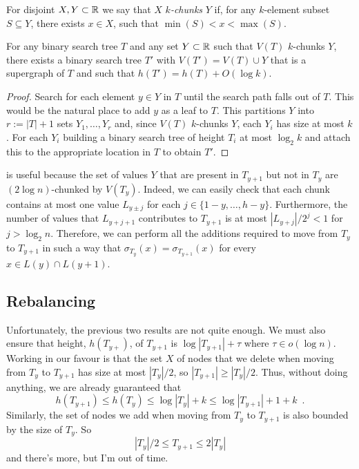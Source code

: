 \documentclass[kpfonts]{patmorin}
\begin{document}
For disjoint $X,Y\subset \mathbb{R}$ we say that $X$ \emph{$k$-chunks} $Y$ if, for any $k$-element subset $S\subseteq Y$, there exists $x\in X$, such that $\min(S)< x<\max(S)$. 

\begin{lem}
  For any binary search tree $T$ and any set $Y\subset\mathbb{R} $ such that $V(T)$ $k$-chunks $Y$, there exists a binary search tree $T'$ with $V(T')=V(T)\cup Y$ that is a supergraph of $T$ and such that $h(T')=h(T)+O(\log k)$.
\end{lem}

\begin{proof}
  Search for each element $y\in Y$ in $T$ until the search path falls out of $T$.  This would be the natural place to add $y$ as a leaf to $T$.  This partitions $Y$ into $r:=|T|+1$ sets $Y_1,\ldots,Y_r$ and, since $V(T)$ $k$-chunks $Y$, each $Y_i$ has size at most $k$.  For each $Y_i$ building a binary search tree of height $T_i$ at most $\log_2 k$ and attach this to the appropriate location in $T$ to obtain $T'$.
\end{proof}

 is useful because the set of values $Y$ that are present in $T_{y+1}$ but not in $T_y$ are $(2\log n)$-chunked by $V(T_y)$. Indeed, we can easily check that each chunk contains at most one value $L_{y\pm j}$ for each $j\in\{1-y,\ldots,h-y\}$.  Furthermore, the number of values that $L_{y+j+1}$ contributes to $T_{y+1}$ is at most $|L_{y+j}|/2^{j}<1$ for $j>\log_2 n$.  Therefore, we can perform all the additions required to move from $T_y$ to $T_{y+1}$ in such a way that $\sigma_{T_y}(x)=\sigma_{T_{y+1}}(x)$ for every $x\in L(y)\cap L(y+1)$.  

\subsection{Rebalancing}


Unfortunately, the previous two results are not quite enough.  We must also ensure that height, $h(T_{y+})$, of $T_{y+1}$ is $\log |T_{y+1}| + \tau$ where $\tau\in o(\log n)$.  Working in our favour is that the set $X$ of nodes that we delete when moving from $T_y$ to $T_{y+1}$ has size at most $|T_y|/2$, so $|T_{y+1}|\ge |T_y|/2$. Thus, without doing anything, we are already guaranteed that 
\[  
  h(T_{y+1})\le h(T_y)\le \log|T_y|+k \le \log|T_{y+1}| + 1 + k \enspace .
\]  
Similarly, the set of nodes we add when moving from $T_y$ to $T_{y+1}$ is also bounded by the size of $T_y$.  So
\[ |T_y|/2\le T_{y+1} \le 2|T_y| \]
and there's more, but I'm out of time.
\end{document}
